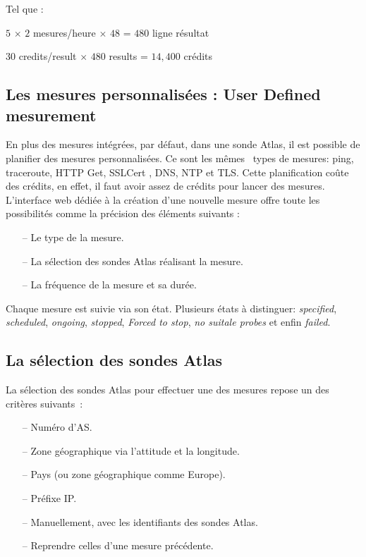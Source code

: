 Tel que :

\begin{tcolorbox}
	\begin{center}
		$5$ $\times$ $2$ mesures/heure $\times$ $48$ = $480$ ligne résultat
		
		$30$ credits/result $\times$ $480$ results = $14,400$ crédits
	\end{center}
\end{tcolorbox}	

\subsection{Les mesures personnalisées : User Defined mesurement} \label{par:udm}

En plus des mesures intégrées, par défaut, dans une sonde Atlas, il est possible de planifier des mesures personnalisées. Ce sont les m\^{e}mes~  types de mesures: ping, traceroute,  HTTP Get, SSLCert , DNS, NTP et TLS. Cette planification coûte des crédits, en effet, il faut avoir assez de crédits pour lancer des mesures. L'interface web dédiée à la création d'une nouvelle mesure offre toute les possibilités comme la précision des éléments suivants :
\begin{itemize}
	\item[--] Le type de la mesure.
	\item[--] La sélection des sondes Atlas réalisant la mesure.
	\item[--] La fréquence de la mesure et sa durée.
\end{itemize}

Chaque mesure est suivie via son état. Plusieurs états à distinguer: \textit{specified}, \textit{scheduled}, \textit{ongoing}, \textit{stopped},  \textit{Forced to stop},  \textit{no suitale probes} et enfin  \textit{failed}.



\subsection{La sélection des sondes Atlas}

La sélection des sondes  Atlas pour effectuer une des mesures repose un des critères suivants~: 
\begin{itemize}
	\item[--] Numéro d'AS.
	\item[--] Zone géographique via  l'attitude et la longitude.
	\item[--] Pays (ou zone géographique comme  Europe).
	\item[--] Préfixe IP. %
	\item[--] Manuellement, avec les identifiants des sondes Atlas.
	\item[--] Reprendre celles d'une  mesure précédente.
\end{itemize}

